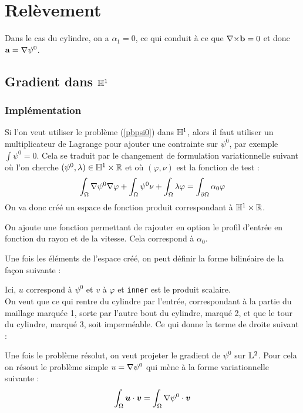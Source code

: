 \chapter{Relèvement}

Dans le cas du cylindre, on a $\alpha_1=0$, ce qui conduit à ce que ${\nabla\times} \mathbf{b}=0$ et donc $\mathbf{a}={\nabla}\psi^0$.

\section{Gradient dans ${\mathbb{H}}^1$}
\label{impGradh1}
\subsection{Implémentation}
Si l'on veut utiliser le problème (\ref{pbpsi0}) dans ${\mathbb{H}}^1$, alors il faut utiliser un multiplicateur de Lagrange pour ajouter une contrainte sur $\psi^0$, par exemple $\int \psi^0 = 0$. Cela se traduit par le changement de formulation variationnelle suivant où l'on cherche $(\psi^0,\lambda)\in {\mathbb{H}}^1\times{\mathbb{R}}$ et où $(\varphi,\nu)$ est la fonction de test :
\[ \int_\Omega{\nabla} \psi^0{\nabla}\varphi + \int_\Omega \psi^0\nu + \int_\Omega \lambda\varphi = \int_{\partial\Omega} \alpha_0\varphi \]
On va donc créé un espace de fonction produit correspondant à ${\mathbb{H}}^1\times{\mathbb{R}}$.



On ajoute une fonction permettant de rajouter en option le profil d'entrée en fonction du rayon et de la vitesse. Cela correspond à $\alpha_0$.



Une fois les éléments de l'espace créé, on peut définir la forme bilinéaire de la façon suivante :



Ici, $u$ correspond à $\psi^0$ et $v$ à $\varphi$ et \texttt{inner} est le produit scalaire.\\

On veut que ce qui rentre du cylindre par l'entrée, correspondant à la partie du maillage marquée 1, sorte par l'autre bout du cylindre, marqué 2, et que le tour du cylindre, marqué 3, soit imperméable. Ce qui donne la terme de droite suivant :



Une fois le problème résolut, on veut projeter le gradient de $\psi^0$ sur ${\mathbb{L}}^2$. Pour cela on résout le problème simple $u={\nabla}\psi^0$ qui mène à la forme variationnelle suivante :
\[ \int_\Omega \bm{u}\cdot\bm{v} = \int_\Omega {\nabla}\psi^0\cdot\bm{v} \]

